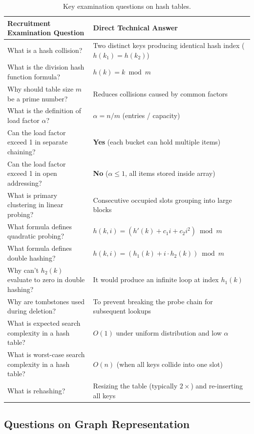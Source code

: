 \begin{table}[htbp]
\centering
\small
\begin{tabularx}{\textwidth}{p{8cm} X}
\toprule
\textbf{Recruitment Examination Question} & \textbf{Direct Technical Answer} \\
\midrule
What is a hash collision? & Two distinct keys producing identical hash index ($h(k_1) = h(k_2)$) \\
What is the division hash function formula? & $h(k) = k \bmod m$ \\
Why should table size $m$ be a prime number? & Reduces collisions caused by common factors \\
What is the definition of load factor $\alpha$? & $\alpha = n / m$ (entries / capacity) \\
Can the load factor exceed 1 in separate chaining? & \textbf{Yes} (each bucket can hold multiple items) \\
Can the load factor exceed 1 in open addressing? & \textbf{No} ($\alpha \leq 1$, all items stored inside array) \\
What is primary clustering in linear probing? & Consecutive occupied slots grouping into large blocks \\
What formula defines quadratic probing? & $h(k, i) = (h'(k) + c_1 i + c_2 i^2) \bmod m$ \\
What formula defines double hashing? & $h(k, i) = (h_1(k) + i \cdot h_2(k)) \bmod m$ \\
Why can't $h_2(k)$ evaluate to zero in double hashing? & It would produce an infinite loop at index $h_1(k)$ \\
Why are tombstones used during deletion? & To prevent breaking the probe chain for subsequent lookups \\
What is expected search complexity in a hash table? & $O(1)$ under uniform distribution and low $\alpha$ \\
What is worst-case search complexity in a hash table? & $O(n)$ (when all keys collide into one slot) \\
What is rehashing? & Resizing the table (typically $2\times$) and re-inserting all keys \\
\bottomrule
\end{tabularx}
\caption{Key examination questions on hash tables.}
\end{table}

\subsection{Questions on Graph Representation}

